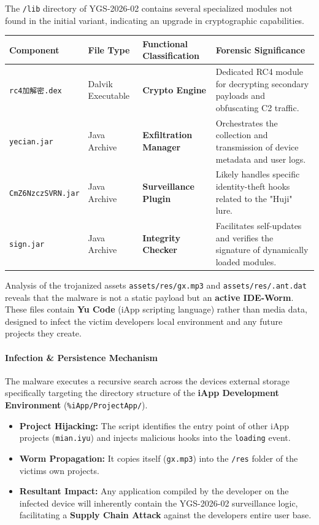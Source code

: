 \documentclass[
]{article}
\begin{document}
The \texttt{/lib} directory of YGS-2026-02 contains several specialized
modules not found in the initial variant, indicating an upgrade in
cryptographic capabilities.

\begin{longtable}[]{@{}llll@{}}
\toprule\noalign{}
Component & File Type & Functional Classification & Forensic
Significance \\
\midrule\noalign{}
\endhead
\bottomrule\noalign{}
\endlastfoot
\texttt{rc4加解密.dex} & Dalvik Executable & \textbf{Crypto Engine} &
Dedicated RC4 module for decrypting secondary payloads and obfuscating
C2 traffic. \\
\texttt{yecian.jar} & Java Archive & \textbf{Exfiltration Manager} &
Orchestrates the collection and transmission of device metadata and user
logs. \\
\texttt{CmZ6NzczSVRN.jar} & Java Archive & \textbf{Surveillance Plugin}
& Likely handles specific identity-theft hooks related to the "Huji"
lure. \\
\texttt{sign.jar} & Java Archive & \textbf{Integrity Checker} &
Facilitates self-updates and verifies the signature of dynamically
loaded modules. \\
\end{longtable}

Analysis of the trojanized assets \texttt{assets/res/gx.mp3} and
\texttt{assets/res/.ant.dat} reveals that the malware is not a static
payload but an \textbf{active IDE-Worm}. These files contain \textbf{Yu
Code} (iApp scripting language) rather than media data, designed to
infect the victim developer\textquotesingle s local environment and any
future projects they create.

\paragraph{\texorpdfstring{\textbf{Infection \& Persistence
Mechanism}}{Infection \& Persistence Mechanism}}\label{infection--persistence-mechanism}

The malware executes a recursive search across the
device\textquotesingle s external storage specifically targeting the
directory structure of the \textbf{iApp Development Environment}
(\texttt{\%iApp/ProjectApp/}).

\begin{itemize}
\item
  \textbf{Project Hijacking:} The script identifies the entry point of
  other iApp projects (\texttt{mian.iyu}) and injects malicious hooks
  into the \texttt{loading} event.
\item
  \textbf{Worm Propagation:} It copies itself (\texttt{gx.mp3}) into the
  \texttt{/res} folder of the victim\textquotesingle s own projects.
\item
  \textbf{Resultant Impact:} Any application compiled by the developer
  on the infected device will inherently contain the YGS-2026-02
  surveillance logic, facilitating a \textbf{Supply Chain Attack}
  against the developer\textquotesingle s entire user base.
\end{itemize}
\end{document}
